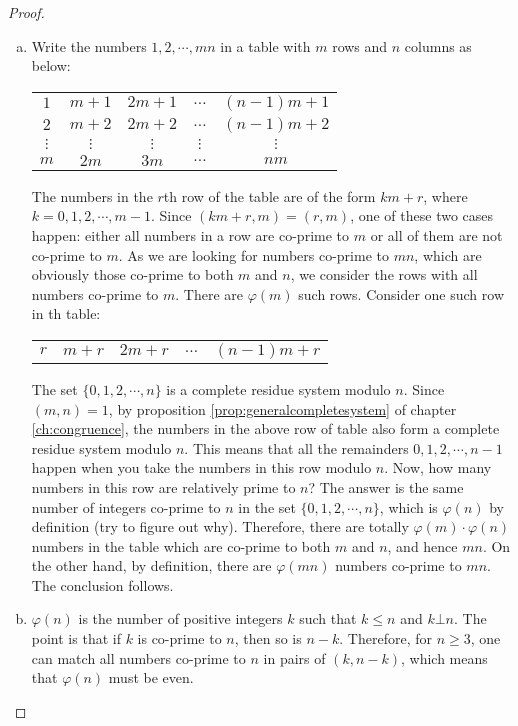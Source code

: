 \documentclass[12pt]{subfile}
\begin{document}
		\begin{proof}
			$ $
			\begin{enumerate}[(a)]
				\item Write the numbers $1,2,\cdots,mn$ in a table with $m$ rows and $n$ columns as below:
					\begin{center}
						\begin{tabular}{ccccc}
							$1$ & $m+1$ & $2m+1$ & $\ldots$ & $(n-1)m+1$\\
							$2$ & $m+2$ & $2m+2$ & $\ldots$ & $(n-1)m+2$\\
							$\vdots$ & $\vdots$ & $\vdots$ & $\vdots$ & $\vdots$\\
							$m$ & $2m$ & $3m$ & $\ldots$ & $nm$
						\end{tabular}
					\end{center}
				The numbers in the $r$th row of the table are of the form $km+r$, where $k=0,1,2,\cdots,m-1$. Since $(km+r,m)=(r,m)$, one of these two cases happen: either all numbers in a row are co-prime to $m$ or all of them are not co-prime to $m$. As we are looking for numbers co-prime to $mn$, which are obviously those co-prime to both $m$ and $n$, we consider the rows with all numbers co-prime to $m$. There are $\varphi(m)$ such rows. Consider one such row in th table:
					\begin{center}
						\begin{tabular}{ccccc}
							$r$ & $m+r$ & $2m+r$ & $\ldots$ & $(n-1)m+r$
						\end{tabular}
					\end{center}
				The set $\{0, 1, 2, \cdots, n\}$ is a complete residue system modulo $n$. Since $(m,n)=1$, by proposition \ref{prop:generalcompletesystem} of chapter \ref{ch:congruence}, the numbers in the above row of table also form a complete residue system modulo $n$. This means that all the remainders $0,1,2,\cdots,n-1$ happen when you take the numbers in this row modulo $n$. Now, how many numbers in this row are relatively prime to $n$? The answer is the same number of integers co-prime to $n$ in the set $\{0, 1, 2, \cdots, n\}$, which is $\varphi(n)$ by definition (try to figure out why). Therefore, there are totally $\varphi(m) \cdot \varphi(n)$ numbers in the table which are co-prime to both $m$ and $n$, and hence $mn$. On the other hand, by definition, there are $\varphi(mn)$ numbers co-prime to $mn$. The conclusion follows.

				\item $\varphi(n)$ is the number of positive integers $k$ such that $k \leq n$ and $k \bot n$. The point is that if $k$ is co-prime to $n$, then so is $n-k$. Therefore, for $n\geq 3$, one can match all numbers co-prime to $n$ in pairs of $(k, n-k)$, which means that $\varphi(n)$ must be even.


\end{enumerate}
\end{proof}
\end{document}
